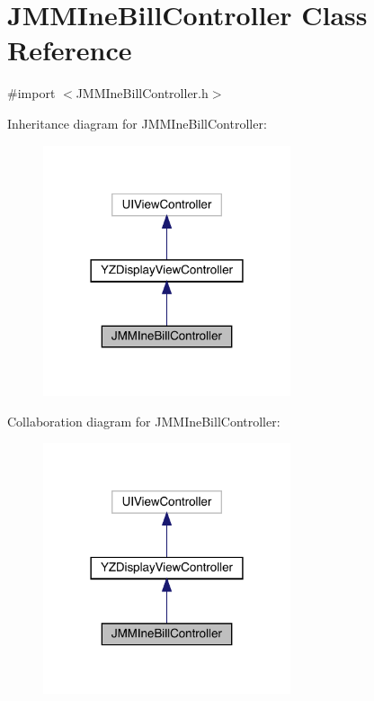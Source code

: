 \hypertarget{interface_j_m_m_ine_bill_controller}{}\section{J\+M\+M\+Ine\+Bill\+Controller Class Reference}
\label{interface_j_m_m_ine_bill_controller}


{\ttfamily \#import $<$J\+M\+M\+Ine\+Bill\+Controller.\+h$>$}



Inheritance diagram for J\+M\+M\+Ine\+Bill\+Controller\+:\nopagebreak
\begin{figure}[H]
\begin{center}
\leavevmode
\includegraphics[width=206pt]{interface_j_m_m_ine_bill_controller__inherit__graph}
\end{center}
\end{figure}


Collaboration diagram for J\+M\+M\+Ine\+Bill\+Controller\+:\nopagebreak
\begin{figure}[H]
\begin{center}
\leavevmode
\includegraphics[width=206pt]{interface_j_m_m_ine_bill_controller__coll__graph}
\end{center}
\end{figure}
